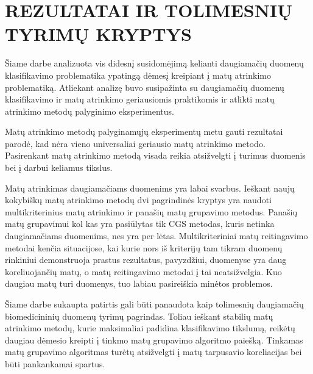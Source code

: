 
\section*{REZULTATAI IR TOLIMESNIŲ TYRIMŲ KRYPTYS}
\label{rezultatai_ir_tolimesniu_tyrimu_kryptys}

Šiame darbe analizuota vis didesnį susidomėjimą kelianti daugiamačių duomenų klasifikavimo problematika ypatingą dėmesį kreipiant į matų atrinkimo problematiką. Atliekant analizę buvo susipažinta su daugiamačių duomenų klasifikavimo ir matų atrinkimo geriausiomis praktikomis ir atlikti matų atrinkimo metodų palyginimo eksperimentus.

Matų atrinkimo metodų palyginamųjų eksperimentų metu gauti rezultatai parodė, kad nėra vieno universaliai geriausio matų atrinkimo metodo. Pasirenkant matų atrinkimo metodą visada reikia atsižvelgti į turimus duomenis bei į darbui keliamus tikslus. 

Matų atrinkimas daugiamačiams duomenims yra labai svarbus. Ieškant naujų kokybiškų matų atrinkimo metodų dvi pagrindinės kryptys yra naudoti multikriterinius matų atrinkimo ir panašių matų grupavimo metodus. Panašių matų grupavimui kol kas yra pasiūlytas tik CGS metodas, kuris netinka daugiamačiams duomenims, nes yra per lėtas. Multikriteriniai matų reitingavimo metodai kenčia situacijose, kai kurie nors iš kriterijų tam tikram duomenų rinkiniui demonstruoja prastus rezultatus, pavyzdžiui, duomenyse yra daug koreliuojančių matų, o matų reitingavimo metodai į tai neatsižvelgia. Kuo daugiau matų turi duomenys, tuo labiau pasireiškia minėtos problemos.

Šiame darbe sukaupta patirtis gali būti panaudota kaip tolimesnių daugiamačių biomedicininių duomenų tyrimų pagrindas. Toliau ieškant stabilių matų atrinkimo metodų, kurie maksimaliai padidina klasifikavimo tikslumą, reikėtų daugiau dėmesio kreipti į tinkmo matų grupavimo algoritmo paiešką. Tinkamas matų grupavimo algoritmas turėtų atsižvelgti į matų tarpusavio koreliacijas bei būti pankankamai spartus.
